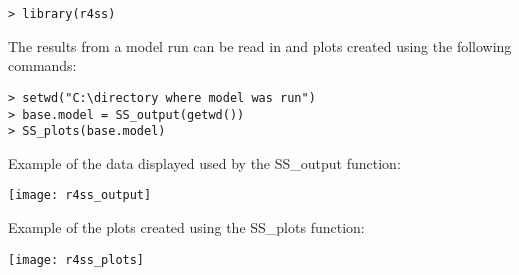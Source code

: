 \begin{verbatim}
> library(r4ss)
\end{verbatim}

The results from a model run can be read in and plots created using the following commands:

\begin{verbatim}
> setwd("C:\directory where model was run")
> base.model = SS_output(getwd())
> SS_plots(base.model)
\end{verbatim}

\pagebreak
Example of the data displayed used by the SS\_output function:
\begin{center}
		\texttt{[image: r4ss\_output]}
\end{center}

\pagebreak
Example of the plots created using the SS\_plots function:
\begin{center}
	\texttt{[image: r4ss\_plots]}
\end{center}

